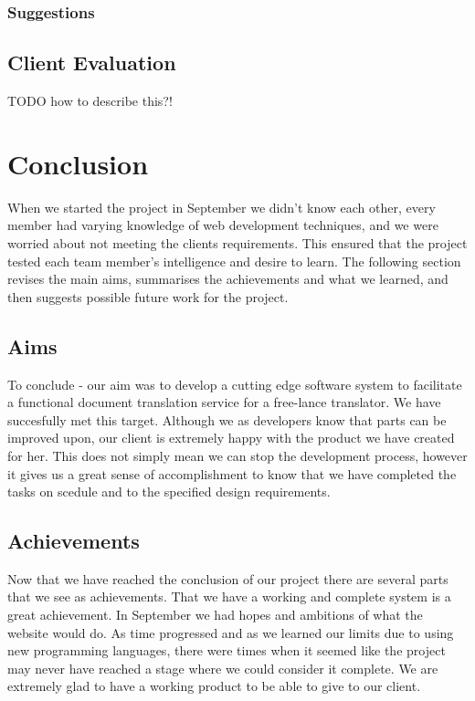\documentclass{l3proj}
\begin{document}
\subsection{Suggestions}

\section{Client Evaluation}
\label{trans-eval}
TODO how to describe this?!

\chapter{Conclusion}
\label{chap:concl}

When we started the project in September we didn't know each other, every member had varying knowledge of
web development techniques, and we were worried about not meeting the clients requirements. This ensured that the project tested each team member’s intelligence
and desire to learn. The following section revises the main aims, summarises the achievements and
what we learned, and then suggests possible future work for the project.

\section{Aims}
\label{sect:aims}
To conclude - our aim was to develop a cutting edge software system to facilitate a functional document translation service for a
free-lance translator. We have succesfully met this target. Although we as developers know that parts can be improved upon, our client
is extremely happy with the product we have created for her. This does not simply mean we can stop the development process, however 
it gives us a great sense of accomplishment to know that we have completed the tasks on scedule and to the specified design requirements.

\section{Achievements}
\label{sect:achv}
Now that we have reached the conclusion of our project there are several parts that we see as achievements.
That we have a working and complete system is a great achievement. In September we had hopes
and ambitions of what the website would do. As time progressed and as we learned our limits due to using new
programming languages, there were times when it seemed like the project may never have reached a stage where 
we could consider it complete. We are extremely glad to have a working product to be able to give to our client.
\end{document}
